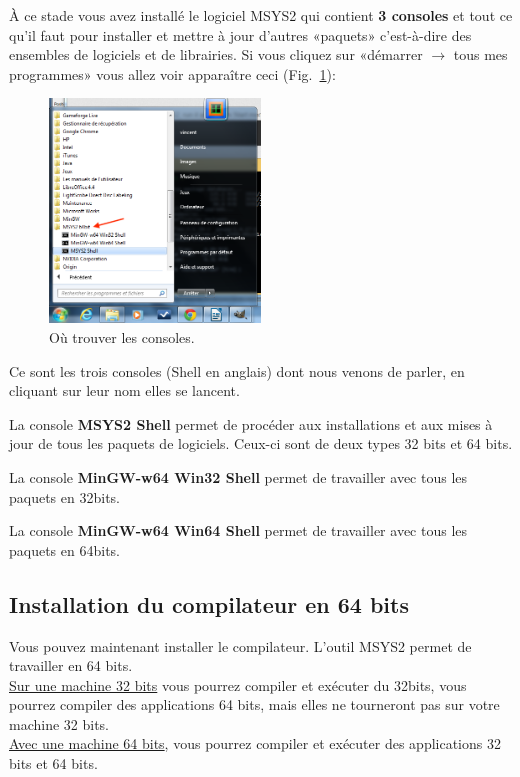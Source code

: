 \documentclass{article}
\newcommand\fig[1]{{Fig.~\ref{#1}}}
\begin{document}
À ce stade vous avez installé le logiciel MSYS2 qui contient \textbf{3 consoles} et tout ce qu'il faut pour installer et mettre à jour d'autres «paquets» c'est-à-dire des ensembles de logiciels et de librairies. Si vous cliquez sur «démarrer $\rightarrow$ tous mes programmes» vous allez voir apparaître ceci (\fig{F:FindMsys2}):
\begin{figure}[H]
\center
\includegraphics[width=0.5\textwidth]{Plots/Msys2_10Start.png}
\caption{Où trouver les consoles.\label{F:FindMsys2}}
\end{figure}

Ce sont les trois consoles (Shell en anglais) dont nous venons de parler, en cliquant sur leur nom elles se lancent.  

La console {\color{Purple}\textbf{MSYS2 Shell}} permet de procéder aux installations et aux mises à jour de tous les paquets de logiciels. Ceux-ci sont de deux types 32 bits et 64 bits.

La console \textbf{MinGW-w64 Win32 Shell} permet de travailler avec tous les paquets en 32bits.

La console {\color{MidnightBlue}\textbf{MinGW-w64 Win64 Shell}} permet de travailler avec tous les paquets en 64bits.

\subsection{Installation du compilateur en 64 bits}
Vous pouvez maintenant installer le compilateur. L'outil MSYS2 permet de travailler en 64 bits.\\\underline{Sur une machine 32 bits} vous pourrez compiler et exécuter du 32bits, vous pourrez compiler des applications 64 bits, mais elles ne tourneront pas sur votre machine 32 bits. \\\underline{Avec une machine 64 bits}, vous pourrez compiler et exécuter des applications 32 bits et 64 bits. 
\end{document}

